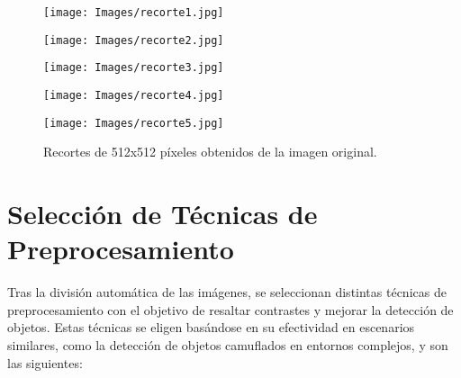 \begin{figure}[ht!]
    \centering
    \begin{minipage}{0.19\textwidth}
        \texttt{[image: Images/recorte1.jpg]}
    \end{minipage}
     \hfill
     \begin{minipage}{0.19\textwidth}
        \texttt{[image: Images/recorte2.jpg]}
     \end{minipage}
    \hfill
     \begin{minipage}{0.19\textwidth}
        \texttt{[image: Images/recorte3.jpg]}
     \end{minipage}
     \hfill
     \begin{minipage}{0.19\textwidth}
         \texttt{[image: Images/recorte4.jpg]}
     \end{minipage}
     \hfill
    \begin{minipage}{0.19\textwidth}
         \texttt{[image: Images/recorte5.jpg]}
     \end{minipage}
     \caption{Recortes de 512x512 píxeles obtenidos de la imagen original.}
     \label{fig:imagen_dividida}
\end{figure}

\section{Selección de Técnicas de Preprocesamiento}
Tras la división automática de las imágenes, se seleccionan distintas técnicas de preprocesamiento con el objetivo de resaltar contrastes y mejorar la detección de objetos. Estas técnicas se eligen basándose en su efectividad en escenarios similares, como la detección de objetos camuflados en entornos complejos, y son las siguientes:

